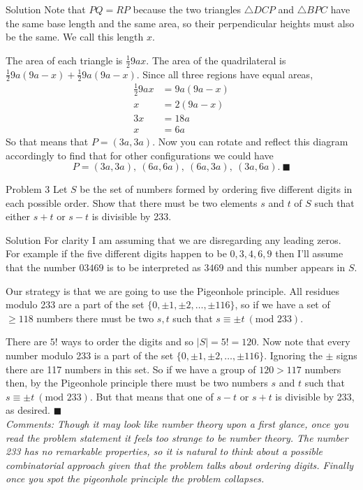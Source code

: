\documentclass{article}
\begin{document}
\begin{solution}{Solution}
Note that $PQ = RP$ because the two triangles $\triangle DCP$ and
$\triangle BPC$ have the same base length and the same area, so their
perpendicular heights must also be the same. We call this length $x$.
\vspace{0.2cm}

The area of each triangle is $\frac12 9ax$. The area of the
quadrilateral is $\frac12 9a(9a-x) + \frac12 9a(9a-x)$. Since all three regions have equal areas,
\[
\begin{aligned}
\frac12 9ax &= 9a(9a-x) \\
x &= 2(9a-x) \\
3x &= 18a \\
x &= 6a
\end{aligned}
\]
So that means that $P = (3a, 3a)$. Now you can rotate and reflect
this diagram accordingly to find that for other configurations we could
have
$$
P = (3a, 3a), \ (6a, 6a),\ (6a, 3a), \ (3a, 6a). \ \blacksquare
$$
\end{solution}
\newpage

\begin{problem}{Problem 3}
Let $S$ be the set of numbers formed by ordering five different digits in
each possible order. Show that there must be two elements $s$ and $t$ of
$S$ such that either $s + t$ or $s - t$ is divisible by 233.
\end{problem}

\begin{solution}{Solution}
For clarity I am assuming that we are disregarding any leading
zeros. For example if the five different digits happen to be
$0, 3, 4, 6, 9$ then I'll assume that the number $03469$ is to be
interpreted as $3469$ and this number appears in $S$. \vspace{0.2cm}

Our strategy is that we are going to use the Pigeonhole principle.
All residues modulo 233 are a part of the set
$\{0,\pm1, \pm2, \ldots, \pm 116\}$, so if we have a set of $ \geq 118$
numbers there must be two $s, t$ such that
$s \equiv \pm t \ (\text{mod } 233)$.
\vspace{-0.2cm}

There are $5!$ ways to order the digits and so $|S| = 5! = 120$. Now
note that every number modulo 233 is a part of the set
$\{0,\pm1, \pm2, \ldots, \pm 116\}$. Ignoring the $\pm$ signs there are
117 numbers in this set. So if we have a group of $120 > 117$ numbers then,
by the Pigeonhole principle there must be two numbers $s$ and $t$ such that
$s \equiv \pm t \ (\text{mod } 233)$. But that means that one of
$s-t$ or $s+t$ is divisible by 233, as desired. $\blacksquare$
\\

\textit{Comments: Though it may look like number theory upon a first
glance, once you read the problem statement it feels too strange to be
number theory. The number 233 has no remarkable properties, so it is
natural to think about a possible combinatorial approach given that
the problem talks about ordering digits. Finally once you spot the
pigeonhole principle the problem collapses.}
\end{solution}
\newpage
\end{document}
